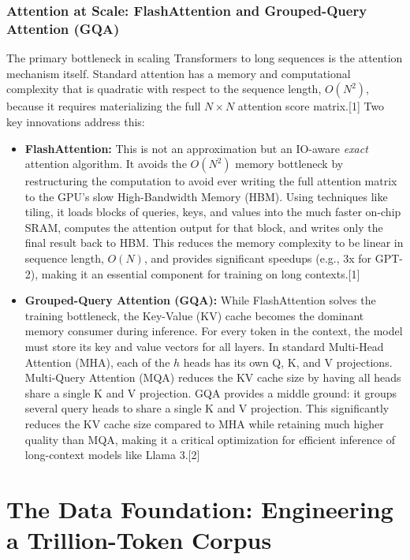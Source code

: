 \documentclass[12pt, a4paper]{article}
\begin{document}
\subsubsection{Attention at Scale: FlashAttention and Grouped-Query Attention (GQA)}

The primary bottleneck in scaling Transformers to long sequences is the attention mechanism itself. Standard attention has a memory and computational complexity that is quadratic with respect to the sequence length, $O(N^2)$, because it requires materializing the full $N \times N$ attention score matrix.[1] Two key innovations address this:

\begin{itemize}
    \item \textbf{FlashAttention:} This is not an approximation but an IO-aware \textit{exact} attention algorithm. It avoids the $O(N^2)$ memory bottleneck by restructuring the computation to avoid ever writing the full attention matrix to the GPU's slow High-Bandwidth Memory (HBM). Using techniques like tiling, it loads blocks of queries, keys, and values into the much faster on-chip SRAM, computes the attention output for that block, and writes only the final result back to HBM. This reduces the memory complexity to be linear in sequence length, $O(N)$, and provides significant speedups (e.g., 3x for GPT-2), making it an essential component for training on long contexts.[1]
    \item \textbf{Grouped-Query Attention (GQA):} While FlashAttention solves the training bottleneck, the Key-Value (KV) cache becomes the dominant memory consumer during inference. For every token in the context, the model must store its key and value vectors for all layers. In standard Multi-Head Attention (MHA), each of the $h$ heads has its own Q, K, and V projections. Multi-Query Attention (MQA) reduces the KV cache size by having all heads share a single K and V projection. GQA provides a middle ground: it groups several query heads to share a single K and V projection. This significantly reduces the KV cache size compared to MHA while retaining much higher quality than MQA, making it a critical optimization for efficient inference of long-context models like Llama 3.[2]
\end{itemize}

\section{The Data Foundation: Engineering a Trillion-Token Corpus}
\end{document}

